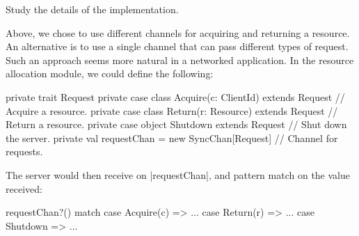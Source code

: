 \begin{instruction}
Study the details of the implementation. 
\end{instruction}

Above, we chose to use different channels for acquiring and returning a
resource.  An alternative is to use a single channel that can pass different
types of request.  Such an approach seems more natural in a networked
application.  In the resource allocation module, we could define the
following:
%
\begin{scala}
  private trait Request
  private case class Acquire(c: ClientId) extends Request // Acquire a resource.
  private case class Return(r: Resource) extends Request // Return a resource.
  private case object Shutdown extends Request // Shut down the server.
  private val requestChan = new SyncChan[Request] // Channel for requests.
\end{scala}
%
The server would then receive on |requestChan|, and pattern match on the value
received:
%
\begin{scala}
  requestChan?() match{
    case Acquire(c) => ...
    case Return(r) => ...
    case Shutdown => ...
  }
\end{scala}
